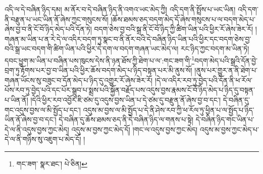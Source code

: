 འདི་ལ་དེ་བཞིན་ཉིད་དམ། མ་ནོར་བ་དེ་བཞིན་ཉིད་ནི་འགའ་ཡང་མེད་ཀྱི། འདི་དག་ནི་སྤྲོས་པ་ཡང་ཡིན། འདི་དག་ནི་བརྫུན་པ་ཡང་ཡིན་ནོ་ཞེས་ཀྱང་གསུངས་སོ། །ཆོས་ཐམས་ཅད་བདག་མེད་དོ་ཞེས་གསུངས་པ་ལ་བདག་མེད་པ་ཞེས་བྱ་བ་ནི་ངོ་བོ་ཉིད་མེད་པའི་དོན་ཏེ། བདག་ཅེས་བྱ་བའི་སྒྲ་ནི་ངོ་བོ་ཉིད་ཀྱི་ཚིག་ཡིན་པའི་ཕྱིར་རོ་ཞེས་ཟེར་རོ། །གཞན་མ་ཡིན་པ་ན་རེ་དེ་ལ་འདིར་བདག་ཏུ་སྣང་བ་ནི་ནོར་བའི་དེ་བཞིན་ཉིད་ཡིན་པའི་ཕྱིར་དང་བདག་ཅེས་བྱ་བའི་སྒྲ་ཡང་བདག་གི་ཚིག་ཡིན་པའི་ཕྱིར་དེ་དག་ལ་བདག་གཞན་ཡང་མེད་ལ། རང་ཉིད་ཀྱང་བདག་མ་ཡིན་ཏེ། དབང་ཕྱུག་མ་ཡིན་པ་བཞིན་པས་ཁུངས་དེས་ནི་ཉན་ཐོས་ཀྱི་ཐེག་པ་ལ་:གང་ཟག་གི་\footnote{གང་ཟག་  སྣར་ཐང་།  པེ་ཅིན། }བདག་མེད་པའི་སྒྲའི་དོན་བྱེ་བྲག་ཏུ་རྟོགས་པར་བྱ་བ་ཡིན་པའི་ཕྱིར་ཆོས་བདག་མེད་པ་ཉིད་བསྟན་པར་མི་ནུས་སོ། །ནུས་པར་གྱུར་ན་ནི་ཐེག་པ་གཞན་ཡོངས་སུ་བཟུང་བ་དོན་མེད་པ་ཉིད་དུ་འགྱུར་རོ་ཞེས་ཟེར་རོ། །དེ་ལ་འདིར་རབ་ཏུ་བྱེད་པའི་དོན་ནི་ཕ་རོལ་པོས་རབ་ཏུ་བྱེད་པའི་དང་པོར་སྒྲུབ་པ་སྨྲས་པའི་སྐྱོན་བརྗོད་པས་འདུས་བྱས་རྣམས་ངོ་བོ་ཉིད་མེད་པ་ཉིད་དུ་བསྟན་པ་ཡིན་ནོ། །དེའི་ཕྱིར་རབ་འབྱོར་ཇི་ཙམ་དུ་འདུས་བྱས་ཡིན་པ་དེ་ཙམ་དུ་བརྫུན་ནོ་ཞེས་བྱ་བ་དང་། དེ་བཞིན་དུ་གང་འདུས་བྱས་ལ་མི་སྤྱོད་པ་དང་། འདུས་མ་བྱས་ལ་མི་སྤྱོད་པ་དེ་ནི་ཤེས་རབ་ཀྱི་ཕ་རོལ་ཏུ་ཕྱིན་པ་ལ་སྤྱོད་པ་ཉིད་ཡིན་ནོ་ཞེས་བྱ་བ་དང་། དེ་བཞིན་དུ་ཆོས་ཐམས་ཅད་ནི་དེ་བཞིན་ཉིད་ལ་གནས་པ་སྟེ། དེ་བཞིན་ཉིད་གང་ཡིན་པ་དེ་ལ་ནི་འདུས་བྱས་ཀྱང་མེད། འདུས་མ་བྱས་ཀྱང་མེད་དོ། །གང་ལ་འདུས་བྱས་ཀྱང་མེད། འདུས་མ་བྱས་ཀྱང་མེད་པ་དེ་ལ་ནི་གཉིས་སུ་འཇུག་པ་མེད་དོ། །
